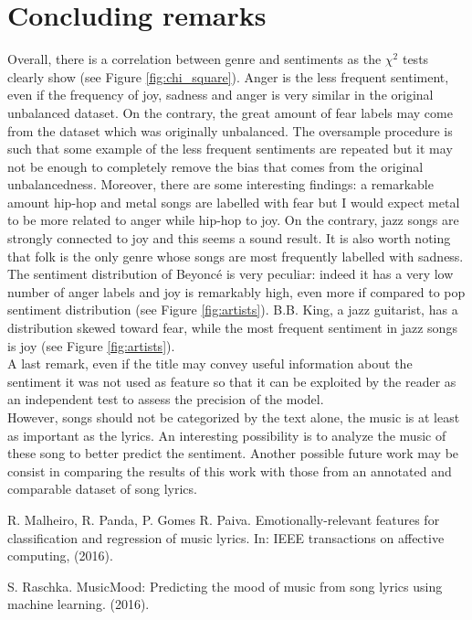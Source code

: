 \documentclass[runningheads]{llncs}
\begin{document}
\section{Concluding remarks}
Overall, there is a correlation between genre and sentiments as the $\chi^2$ tests clearly show (see Figure \ref{fig:chi_square}). Anger is the less frequent sentiment, even if the frequency of joy, sadness and anger is very similar in the original unbalanced dataset. On the contrary, the great amount of fear labels may come from the dataset which was originally unbalanced. The oversample procedure is such that some example of the less frequent sentiments are repeated but it may not be enough to completely remove the bias that comes from the original unbalancedness. Moreover, there are some interesting findings: a remarkable amount hip-hop and metal songs are labelled with fear but I would expect metal to be more related to anger while hip-hop to joy. On the contrary, jazz songs are strongly connected to joy and this seems a sound result. It is also worth noting that folk is the only genre whose songs are most frequently labelled with sadness.\\ 
The sentiment distribution of Beyoncé is very peculiar: indeed it has a very low number of anger labels and joy is remarkably high, even more if compared to pop sentiment distribution (see Figure \ref{fig:artists}). B.B. King, a jazz guitarist, has a distribution skewed toward fear, while the most frequent sentiment in jazz songs is joy (see Figure \ref{fig:artists}). \\
A last remark, even if the title may convey useful information about the sentiment it was not used as feature so that it can be exploited by the reader as an independent test to assess the precision of the model.\\

However, songs should not be categorized by the text alone, the music is at least as important as the lyrics. An interesting possibility is to analyze the music of these song to better predict the sentiment. Another possible future work may be consist in comparing the results of this work with those from an annotated and comparable dataset of song lyrics.\\

\begin{thebibliography}{8}

R. Malheiro, R. Panda, P. Gomes  R. Paiva. Emotionally-relevant features for classification and regression of music lyrics. In: IEEE transactions on affective computing, (2016).

S. Raschka. MusicMood: Predicting the mood of music from song lyrics using machine learning. (2016).
\end{thebibliography}
\end{document}
